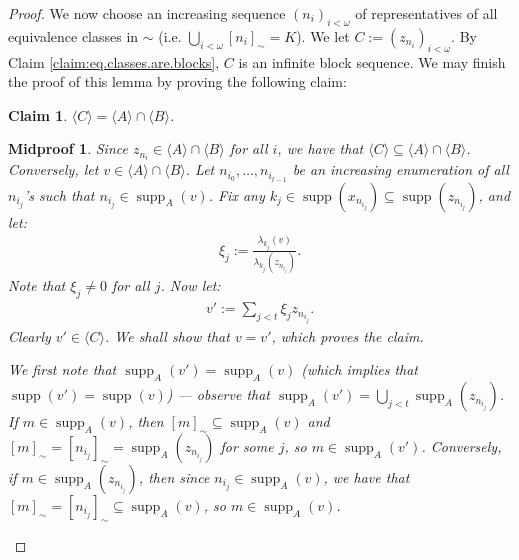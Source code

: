 \documentclass[10pt,a4paper]{amsart}
\newtheorem{claim}{Claim}
\newtheorem{midproof}{Midproof}
\renewcommand{\c}[1]{\langle #1 \rangle}
\newcommand{\func}{\operatorname}
\newcommand{\supp}{\func{supp}}
\begin{document}
\begin{proof}
    We now choose an increasing sequence $(n_i)_{i<\omega}$ of representatives of all equivalence classes in $\sim$ (i.e. $\bigcup_{i<\omega} [n_i]_\sim = K$). We let $C := (z_{n_i})_{i<\omega}$. By Claim \ref{claim:eq.classes.are.blocks}, $C$ is an infinite block sequence. We may finish the proof of this lemma by proving the following claim:

    \begin{claim}
        $\c{C} = \c{A} \cap \c{B}$.
    \end{claim}

    \begin{midproof}
        Since $z_{n_i} \in \c{A} \cap \c{B}$ for all $i$, we have that $\c{C} \subseteq \c{A} \cap \c{B}$. Conversely, let $v \in \c{A} \cap \c{B}$. Let $n_{i_0},\dots,n_{i_{t-1}}$ be an increasing enumeration of all $n_{i_j}$'s such that $n_{i_j} \in \supp_A(v)$. Fix any $k_j \in \supp(x_{n_{i_j}}) \subseteq \supp(z_{n_{i_j}})$, and let:
        \begin{align*}
            \xi_j := \frac{\lambda_{k_j}(v)}{\lambda_{k_j}(z_{n_{i_j}})}.
        \end{align*}
        Note that $\xi_j \neq 0$ for all $j$. Now let:
        \begin{align*}
            v' := \sum_{j<t} \xi_jz_{n_{i_j}}.
        \end{align*}
        Clearly $v' \in \c{C}$. We shall show that $v = v'$, which proves the claim.

        We first note that $\supp_A(v') = \supp_A(v)$ (which implies that $\supp(v') = \supp(v)$) --- observe that $\supp_A(v') = \bigcup_{j<t} \supp_A(z_{n_{i_j}})$. If $m \in \supp_A(v)$, then $[m]_\sim \subseteq \supp_A(v)$ and $[m]_\sim = [n_{i_j}]_\sim = \supp_A(z_{n_{i_j}})$ for some $j$, so $m \in \supp_A(v')$. Conversely, if $m \in \supp_A(z_{n_{i_j}})$, then since $n_{i_j} \in \supp_A(v)$, we have that $[m]_\sim = [n_{i_j}]_\sim \subseteq \supp_A(v)$, so $m \in \supp_A(v)$. 


\end{midproof}
\end{proof}
\end{document}
